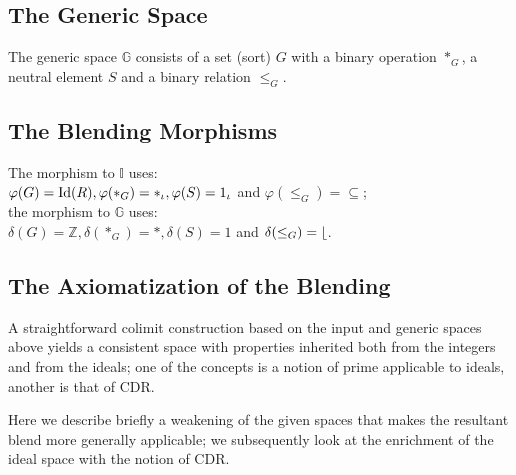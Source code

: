 \subsection{The Generic Space}

The generic space $\mathbb{G}$ consists of a set (sort) $G$ with a
binary operation $*_G$, a neutral element $S$ and a binary relation
$\leq_G$.


\subsection{The Blending Morphisms}

The morphism to $\mathbb{I}$  uses:\\
$\varphi(G)={\rm Id}(R),\varphi(*_G)=*_{\iota},
\varphi(S)=1_{\iota}$ and $\varphi(\leq_G)=\subseteq$;\\
the morphism to $\mathbb{G}$ uses:\\ $\delta(G)=\mathbb{Z}, \delta(*_G)=*,
\delta(S)=1$ and $\delta(\leq_G)= \lfloor$.


\subsection{The Axiomatization of the Blending}

A straightforward colimit construction based on the input and generic
spaces above yields a consistent space with properties inherited both
from the integers and from the ideals; one of the concepts is a notion
of prime applicable to ideals, another is that of CDR.

Here we describe briefly a weakening of the given spaces
that makes the resultant blend more generally applicable;
we subsequently look at the enrichment of the ideal space
with the notion of CDR.

